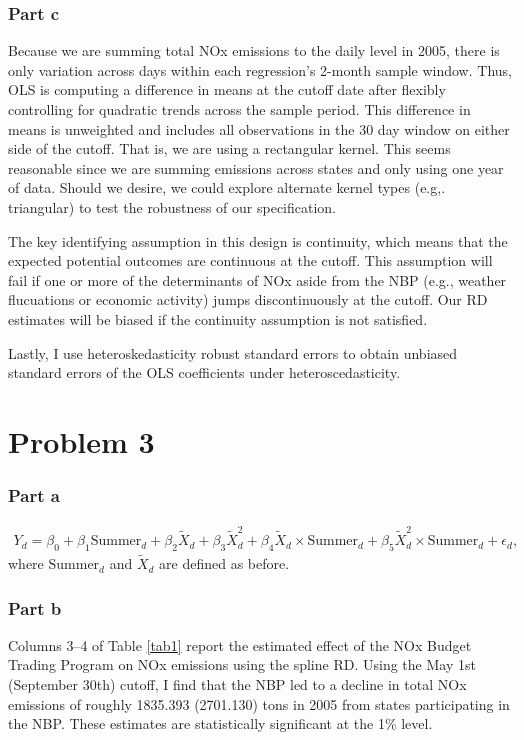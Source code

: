 \documentclass[12pt]{article}
\begin{document}
\subsubsection*{Part c}
Because we are summing total NOx emissions to the daily level in 2005, there is only variation across days within each regression's 2-month sample window. Thus, OLS is computing a difference in means at the cutoff date after flexibly controlling for quadratic trends across the sample period. This difference in means is unweighted and includes all observations in the 30 day window on either side of the cutoff. That is, we are using a rectangular kernel. This seems reasonable since we are summing emissions across states and only using one year of data. Should we desire, we could explore alternate kernel types (e.g,. triangular) to test the robustness of our specification.

The key identifying assumption in this design is continuity, which means that the expected potential outcomes are continuous at the cutoff. This assumption will fail if one or more of the determinants of NOx aside from the NBP (e.g., weather flucuations or economic activity) jumps discontinuously at the cutoff. Our RD estimates will be biased if the continuity assumption is not satisfied.

Lastly, I use heteroskedasticity robust standard errors to obtain unbiased standard errors of the OLS coefficients under heteroscedasticity.

\section*{Problem 3}

\subsubsection*{Part a}

\begin{align}
	Y_d = \beta_0 + \beta_1 \text{Summer}_d + \beta_2 \tilde{X}_d + \beta_3 \tilde{X}_d^2 + \beta_4 \tilde{X}_d \times 
		\text{Summer}_d + \beta_5 \tilde{X}_d^2 \times \text{Summer}_d + \epsilon_d,
\end{align}
where $\text{Summer}_d$ and $ \tilde{X}_d$ are defined as before.

\subsubsection*{Part b}
Columns 3--4 of Table \ref{tab1} report the estimated effect of the NOx Budget Trading Program on NOx emissions using the spline RD. Using the May 1st (September 30th) cutoff, I find that the NBP led to a decline in total NOx emissions of roughly 1835.393 (2701.130) tons in 2005 from states participating in the NBP. These estimates are statistically significant at the 1\% level.
\end{document}
